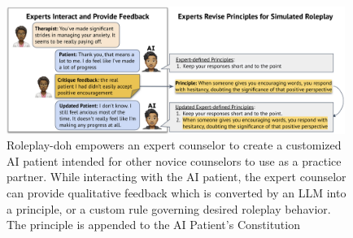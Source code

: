 \documentclass[11pt]{article}
\newcommand{\raj}[1]{\ifthenelse{\boolean{showcomments}}{\textcolor{purple}{[#1 —raj]}}{}}
\begin{document}
\begin{figure}[t]
    \centering
    \includegraphics[width=0.98\textwidth]{figures/rpdteaser-clean.png}
    \caption{Roleplay-doh empowers an expert counselor to create a customized AI patient intended for other novice counselors to use as a practice partner. While interacting with the AI patient, the expert counselor can provide qualitative feedback which is converted by an LLM into a principle, or a custom rule governing desired roleplay behavior. The principle is appended to the AI Patient's Constitution }
    \label{fig:rpdteaser}
\end{figure}


\end{document}
